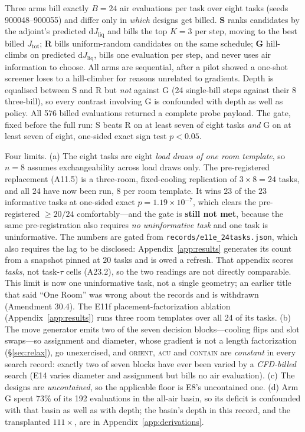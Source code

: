 \documentclass{article}
\newcommand{\Jliq}{J_{\mathrm{liq}}}
\newcommand{\Jtot}{J_{\mathrm{tot}}}
\begin{document}
Three arms bill exactly $B = 24$ air evaluations per task over eight tasks (seeds
900048--900055) and differ only in \emph{which} designs get billed.  \textbf{S} ranks
candidates by the adjoint's predicted $\mathrm{d}\Jliq$ and bills the top $K = 3$ per
step, moving to the best billed $\Jtot$; \textbf{R} bills uniform-random candidates on
the same schedule; \textbf{G} hill-climbs on predicted $\mathrm{d}\Jliq$, bills one
evaluation per step, and never uses air information to choose.  All arms are sequential, after a pilot showed a one-shot screener loses to a hill-climber
for reasons unrelated to gradients.  Depth is equalised between S and R but \emph{not} against G
(24 single-bill steps against their 8 three-bill), so every contrast involving G is confounded
with depth as well as policy.  All 576 billed evaluations returned a complete probe payload.  The gate, fixed
before the full run: S beats R on at least seven of eight tasks \emph{and} G on at least
seven of eight, one-sided exact sign test $p < 0.05$.

Four limits.  (a) The eight tasks are eight \emph{load draws of one room template}, so
$n = 8$ assumes exchangeability across load draws only.  The pre-registered replacement
(A11.5) is a three-room, fixed-cooling replication of $3\times8 = 24$ tasks, and all $24$
have now been run, $8$ per room template.  It wins $23$ of the $23$ informative tasks at
one-sided exact $p = 1.19\times10^{-7}$, which clears the pre-registered $\ge 20/24$
comfortably---and the gate is \textbf{still not met}, because the same pre-registration also
requires \emph{no uninformative task} and one task is uninformative.  The numbers are gated from
\texttt{records/e11e\_24tasks.json}, which also requires the lag to be disclosed:
Appendix~\ref{app:results} generates its count from a snapshot pinned at $20$ tasks and is owed a
refresh.  That appendix scores \emph{tasks}, not task-$\tau$ cells (A23.2), so the two readings are not
directly comparable.  This limit is now one uninformative task, not a single geometry; an earlier
title that said ``One Room'' was wrong about the records and is withdrawn (Amendment 30.4).  The
E11f placement-factorization ablation (Appendix~\ref{app:results}) runs three room templates over
all 24 of its tasks.  (b) The move generator emits two of the seven decision blocks---cooling
flips and slot swaps---so assignment and diameter, whose gradient is not a length factorization
(\S\ref{sec:relax}), go unexercised, and \textsc{orient}, \textsc{acu} and \textsc{contain} are
\emph{constant} in every search record: exactly two of seven blocks have ever been varied by a
\emph{CFD-billed} search (E14 varies diameter and assignment but bills no air evaluation).  (c) The designs are
\emph{uncontained}, so the applicable floor is E8's uncontained one.  (d) Arm G spent
$73\%$ of its 192 evaluations in the all-air basin, so its deficit is confounded with that
basin as well as with depth; the basin's depth in this record, and the transplanted
$111\times$, are in Appendix~\ref{app:derivations}.
\end{document}
